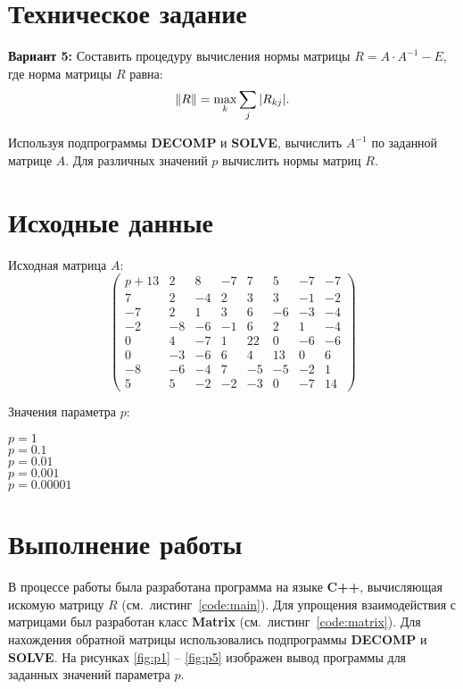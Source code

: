 





\section{Техническое задание}

\textbf{Вариант 5:} Составить процедуру вычисления нормы матрицы $R = A\cdot A^{-1} - E$, где норма матрицы $R$ равна:
\[
\left\lVert R\right\rVert = \max_k \sum_j |R_{kj}|.
\]

Используя подпрограммы \textbf{DECOMP} и \textbf{SOLVE}, вычислить $A^{-1}$ по заданной матрице $A$. Для различных значений $p$ вычислить нормы матриц $R$.

\section{Исходные данные}

Исходная матрица $A$:
\[
\begin{pmatrix}
  p+13 & 2  & 8  & -7 & 7  & 5  & -7 & -7 \\
  7    & 2  & -4 & 2  & 3  & 3  & -1 & -2 \\
  -7   & 2  & 1  & 3  & 6  & -6 & -3 & -4 \\
  -2   & -8 & -6 & -1 & 6  & 2  & 1  & -4 \\
  0    & 4  & -7 & 1  & 22 & 0  & -6 & -6 \\
  0    & -3 & -6 & 6  & 4  & 13 & 0  & 6  \\
  -8   & -6 & -4 & 7  & -5 & -5 & -2 & 1  \\
  5    & 5  & -2 & -2 & -3 & 0  & -7 & 14
\end{pmatrix}
\]

Значения параметра $p$:
\begin{multicols}{5} 
	$p = 1$ \\
	$p = 0.1$ \\
	$p = 0.01$ \\
	$p = 0.001$ \\
	$p = 0.00001$
\end{multicols}

\section{Выполнение работы}

В процессе работы была разработана программа на языке \textbf{C++}, вычисляющая искомую матрицу $R$ (см.~листинг~\ref{code:main}). Для упрощения взаимодействия с матрицами был разработан класс \textbf{Matrix} (см.~листинг~\ref{code:matrix}). Для нахождения обратной матрицы использовались подпрограммы \textbf{DECOMP} и \textbf{SOLVE}. На рисунках \ref{fig:p1} -- \ref{fig:p5} изображен вывод программы для заданных значений параметра $p$.

